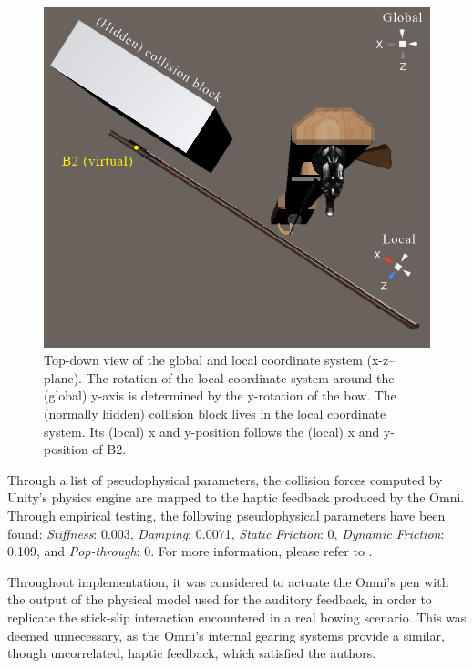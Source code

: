 \begin{figure}[t]\includegraphics[width=\paperFigWidth\textwidth]{figures/globalLocalUpdated.png}
\centering
    \caption{Top-down view of the global and local coordinate system (x-z--plane). The rotation of the local coordinate system around the (global) y-axis is determined by the y-rotation of the bow. The (normally hidden) collision block lives in the local coordinate system. Its (local) x and y-position follows the (local) x and y-position of B2.\label{fig:localGlobal}}
\end{figure}
Through a list of pseudophysical parameters, the collision forces computed by Unity's physics engine are mapped to the haptic feedback produced by the Omni. Through empirical testing, the following pseudophysical parameters have been found: \textit{Stiffness}: 0.003, \textit{Damping}: 0.0071, \textit{Static Friction}: 0, \textit{Dynamic Friction}: 0.109, and \textit{Pop-through}: 0. For more information, please refer to \cite{OmniAPI2018}.

Throughout implementation, it was considered to actuate the Omni's pen with the output of the physical model used for the auditory feedback, in order to replicate the stick-slip interaction encountered in a real bowing scenario. This was deemed unnecessary, as the Omni's internal gearing systems provide a similar, though uncorrelated, haptic feedback, which satisfied the authors.

%
